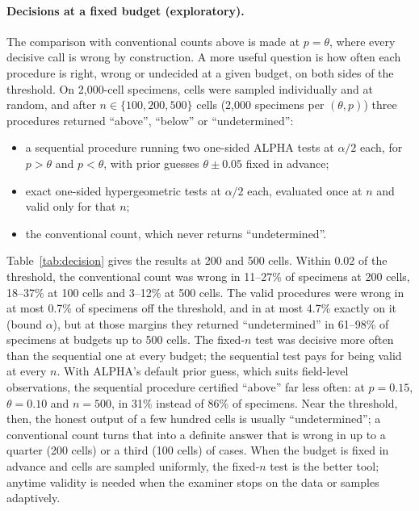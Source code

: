 \documentclass[11pt]{article}
\theoremstyle{remark}
\theoremstyle{definition}
\begin{document}
\paragraph{Decisions at a fixed budget (exploratory).} The comparison with conventional counts above is made at $p=\theta$, where every decisive call is wrong by construction. A more useful question is how often each procedure is right, wrong or undecided at a given budget, on both sides of the threshold. On 2,000-cell specimens, cells were sampled individually and at random, and after $n\in\{100,200,500\}$ cells (2,000 specimens per $(\theta,p)$) three procedures returned ``above'', ``below'' or ``undetermined'':
\begin{itemize}
\item a sequential procedure running two one-sided ALPHA tests at $\alpha/2$ each, for $p>\theta$ and $p<\theta$, with prior guesses $\theta\pm0.05$ fixed in advance;
\item exact one-sided hypergeometric tests at $\alpha/2$ each, evaluated once at $n$ and valid only for that $n$;
\item the conventional count, which never returns ``undetermined''.
\end{itemize}
Table~\ref{tab:decision} gives the results at 200 and 500 cells. Within 0.02 of the threshold, the conventional count was wrong in 11--27\% of specimens at 200 cells, 18--37\% at 100 cells and 3--12\% at 500 cells. The valid procedures were wrong in at most 0.7\% of specimens off the threshold, and in at most 4.7\% exactly on it (bound $\alpha$), but at those margins they returned ``undetermined'' in 61--98\% of specimens at budgets up to 500 cells. The fixed-$n$ test was decisive more often than the sequential one at every budget; the sequential test pays for being valid at every $n$. With ALPHA's default prior guess, which suits field-level observations, the sequential procedure certified ``above'' far less often: at $p=0.15$, $\theta=0.10$ and $n=500$, in 31\% instead of 86\% of specimens. Near the threshold, then, the honest output of a few hundred cells is usually ``undetermined''; a conventional count turns that into a definite answer that is wrong in up to a quarter (200 cells) or a third (100 cells) of cases. When the budget is fixed in advance and cells are sampled uniformly, the fixed-$n$ test is the better tool; anytime validity is needed when the examiner stops on the data or samples adaptively.
\end{document}
